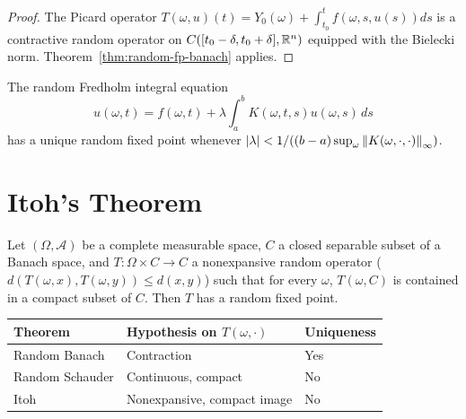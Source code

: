 \begin{proof}
The Picard operator
$T(\omega, u)(t) = Y_0(\omega) + \int_{t_0}^t f(\omega, s, u(s)) ds$ is a contractive
random operator on $C([t_0-\delta, t_0+\delta], \mathbb{R}^n)$ equipped with the Bielecki norm.
Theorem~\ref{thm:random-fp-banach} applies.
\end{proof}

\begin{proposition}
The random Fredholm integral equation
\[
  u(\omega, t) = f(\omega, t) + \lambda \int_a^b K(\omega, t, s) u(\omega, s) \, ds
\]
has a unique random fixed point whenever
$\left| \lambda \right| < 1/((b-a) \sup_\omega \left\| K(\omega, \cdot, \cdot) \right\|_\infty)$.
\end{proposition}

\section{Itoh's Theorem}

\begin{theorem}[Itoh]
\label{thm:itoh}
Let $(\Omega, \mathcal{A})$ be a complete measurable space, $C$ a closed separable subset
of a Banach space, and $T\colon \Omega \times C \to C$ a nonexpansive random operator
($d(T(\omega,x), T(\omega,y)) \leq d(x,y)$) such that for every $\omega$, $T(\omega, C)$
is contained in a compact subset of $C$. Then $T$ has a random fixed point.
\end{theorem}

\begin{keyformulas}[title=\textbf{Summary of random fixed point theorems}]
\begin{center}
\renewcommand{\arraystretch}{1.3}
\begin{tabular}{|l|l|l|}
\hline
\textbf{Theorem} & \textbf{Hypothesis on $T(\omega, \cdot)$} & \textbf{Uniqueness} \\
\hline
Random Banach & Contraction & Yes \\
Random Schauder & Continuous, compact & No \\
Itoh & Nonexpansive, compact image & No \\
\hline
\end{tabular}
\end{center}
\end{keyformulas}

